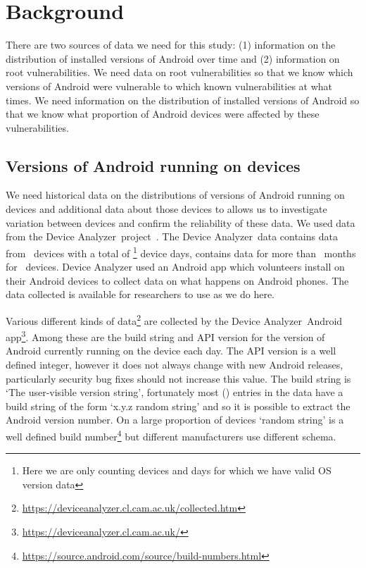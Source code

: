 \documentclass[conference,a4paper,twoside]{IEEEtran}
\newcommand{\da}{Device Analyzer}
\newcommand{\daNumDevices}{\daNumOSDevices}
\newcommand{\daDeviceDays}{\daOSTotalDaysData}
\begin{document}
\section{Background}
\label{sec:background}
There are two sources of data we need for this study: (1) information on the distribution of installed versions of Android over time and (2) information on root vulnerabilities.
We need data on root vulnerabilities so that we know which versions of Android were vulnerable to which known vulnerabilities at what times.
We need information on the distribution of installed versions of Android so that we know what proportion of Android devices were affected by these vulnerabilities.


\subsection{Versions of Android running on devices}
We need historical data on the distributions of versions of Android running on devices and additional data about those devices to allows us to investigate variation between devices and confirm the reliability of these data.
We used data from the \da\ project~\cite{Wagner2013}.
The \da\ data contains data from \daNumDevices\ devices with a total of \daDeviceDays\footnote{Here we are only counting devices and days for which we have valid OS version data} device days, contains data for more than \daMonths\ months for \daMonthsDevices\ devices.
Device Analyzer used an Android app which volunteers install on their Android devices to collect data on what happens on Android phones.
The data collected is available for researchers to use as we do here.

Various different kinds of data\footnote{\url{https://deviceanalyzer.cl.cam.ac.uk/collected.htm}} are collected by the \da\ Android app\footnote{\url{https://deviceanalyzer.cl.cam.ac.uk/}}.
Among these are the build string and API version for the version of Android currently running on the device each day.
The API version is a well defined integer, however it does not always change with new Android releases, particularly security bug fixes should not increase this value.
The build string is `The user-visible version string', fortunately most (\daOSVersionPercValidLines) entries in the data have a build string of the form `x.y.z random string' and so it is possible to extract the Android version number.
On a large proportion of devices `random string' is a well defined build number\footnote{\url{https://source.android.com/source/build-numbers.html}} but different manufacturers use different schema.
\end{document}
